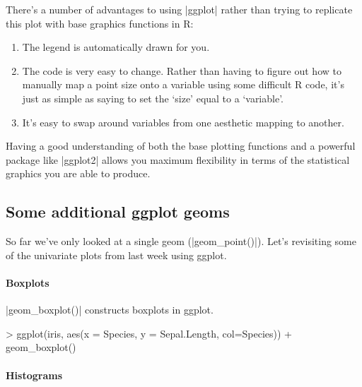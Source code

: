 There's a number of advantages to using |ggplot|  rather than trying
to replicate this plot with base graphics functions in R:
%
\begin{enumerate}
\item The legend is automatically drawn for you.
\item The code is very easy to change. Rather than having to figure out
   how to manually map a point size onto a variable using some
   difficult R code, it's just as simple as saying to set the `size'
   equal to a `variable'.
\item It's easy to swap around variables from one aesthetic mapping to another.
\end{enumerate}
%

Having a good understanding of both the base plotting functions and a powerful package like |ggplot2| allows you maximum flexibility in terms of the statistical graphics you are able to produce.


\subsection{Some additional ggplot geoms}

So far we've only looked at a single geom (|geom_point()|).  Let's revisiting some of the univariate plots from last week using ggplot.

\paragraph{Boxplots}

|geom_boxplot()| constructs boxplots in ggplot.
%
\begin{R}
> ggplot(iris, aes(x = Species, y = Sepal.Length, col=Species)) + 
      geom_boxplot()
\end{R}


\paragraph{Histograms}

